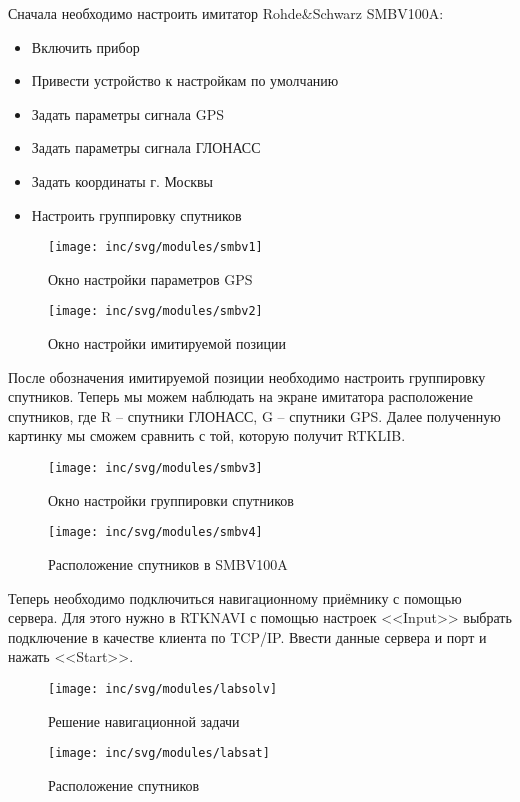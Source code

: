 Сначала необходимо настроить имитатор Rohde\&Schwarz SMBV100A:
\begin{itemize}
	\item Включить прибор
	\item Привести устройство к настройкам по умолчанию
	\item Задать параметры сигнала GPS
	\item Задать параметры сигнала ГЛОНАСС
	\item Задать координаты г. Москвы
	\item Настроить группировку спутников
\end{itemize}
\begin{figure}[ht]
	\centering
	\texttt{[image: inc/svg/modules/smbv1]}
	\caption{Окно настройки параметров GPS}
	\label{fig:smbv1}
\end{figure}
\begin{figure}[h!]
	\centering
	\texttt{[image: inc/svg/modules/smbv2]}
	\caption{Окно настройки имитируемой позиции}
	\label{fig:smbv2}
\end{figure}
\newpage
После обозначения имитируемой позиции необходимо настроить группировку спутников. Теперь мы можем наблюдать на экране имитатора расположение спутников, где R -- спутники ГЛОНАСС, G -- спутники GPS. Далее полученную картинку мы сможем сравнить с той, которую получит RTKLIB.
\begin{figure}[h!]
	\centering
	\texttt{[image: inc/svg/modules/smbv3]}
	\caption{Окно настройки группировки спутников}
	\label{fig:smbv3}
\end{figure}
\begin{figure}[h!]
	\centering
	\texttt{[image: inc/svg/modules/smbv4]}
	\caption{Расположение спутников в SMBV100A}
	\label{fig:smbv4}
\end{figure}
\newpage
Теперь необходимо подключиться навигационному приёмнику с помощью сервера. Для этого нужно в RTKNAVI с помощью настроек <<Input>> выбрать подключение в качестве клиента по TCP/IP. Ввести данные сервера и порт и нажать <<Start>>.
\begin{figure}[h!]
	\centering
	\texttt{[image: inc/svg/modules/labsolv]}
	\caption{Решение навигационной задачи}
	\label{fig:labsolv}
\end{figure}
\begin{figure}[h!]
	\centering
	\texttt{[image: inc/svg/modules/labsat]}
	\caption{Расположение спутников}
	\label{fig:labsat}
\end{figure}
